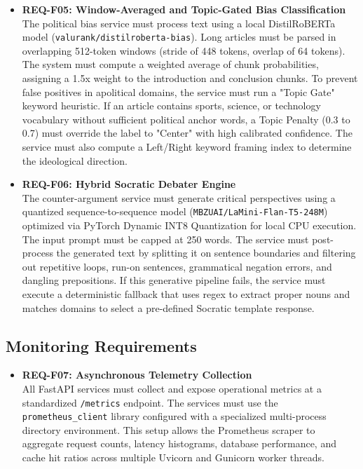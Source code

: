 \begin{itemize}
    \item \textbf{REQ-F05: Window-Averaged and Topic-Gated Bias Classification} \\
    The political bias service must process text using a local DistilRoBERTa model (\texttt{valurank/\allowbreak{}distilroberta-\allowbreak{}bias}). Long articles must be parsed in overlapping 512-token windows (stride of 448 tokens, overlap of 64 tokens). The system must compute a weighted average of chunk probabilities, assigning a 1.5x weight to the introduction and conclusion chunks. To prevent false positives in apolitical domains, the service must run a "Topic Gate" keyword heuristic. If an article contains sports, science, or technology vocabulary without sufficient political anchor words, a Topic Penalty (0.3 to 0.7) must override the label to "Center" with high calibrated confidence. The service must also compute a Left/Right keyword framing index to determine the ideological direction.
    \item \textbf{REQ-F06: Hybrid Socratic Debater Engine} \\
    The counter-argument service must generate critical perspectives using a quantized sequence-to-sequence model (\texttt{MBZUAI/\allowbreak{}LaMini-\allowbreak{}Flan-\allowbreak{}T5-\allowbreak{}248M}) optimized via PyTorch Dynamic INT8 Quantization for local CPU execution. The input prompt must be capped at 250 words. The service must post-process the generated text by splitting it on sentence boundaries and filtering out repetitive loops, run-on sentences, grammatical negation errors, and dangling prepositions. If this generative pipeline fails, the service must execute a deterministic fallback that uses regex to extract proper nouns and matches domains to select a pre-defined Socratic template response.
\end{itemize}

\subsection{Monitoring Requirements}
\begin{itemize}
    \item \textbf{REQ-F07: Asynchronous Telemetry Collection} \\
    All FastAPI services must collect and expose operational metrics at a standardized \texttt{/metrics} endpoint. The services must use the \texttt{prometheus\_client} library configured with a specialized multi-process directory environment. This setup allows the Prometheus scraper to aggregate request counts, latency histograms, database performance, and cache hit ratios across multiple Uvicorn and Gunicorn worker threads.
\end{itemize}

